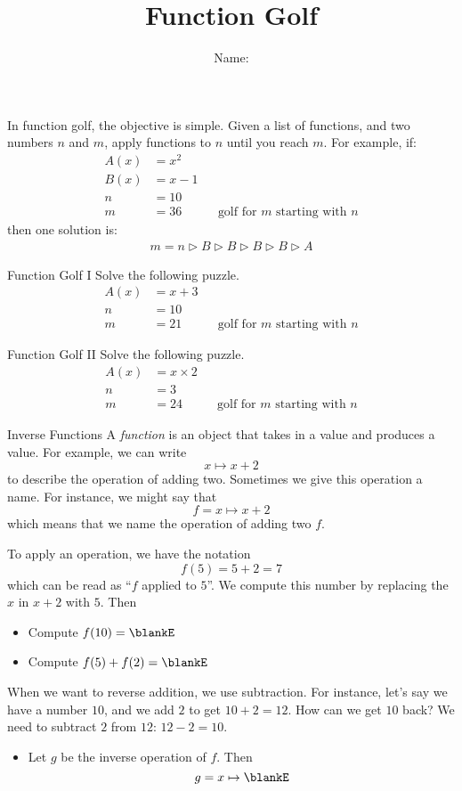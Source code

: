 \documentclass[12pt,letterpaper]{article}
\title{Function Golf}
\author{Name: \underline{\hspace{5cm}}}
\begin{document}
\HomeworkTitle

\thispagestyle{empty}

In function golf, the objective is simple. Given a list of functions, and two
numbers $n$ and $m$, apply functions to $n$ until you reach $m$. For example,
if:
\begin{align*}
 A(x) &= x^2 \\
 B(x) &= x-1 \\
 n &= 10 \\
 m &= 36 && \text{golf for $m$ starting with $n$}
\end{align*}
then one solution is:
\begin{align*}
 m = n \rhd B \rhd B \rhd B \rhd B \rhd A
\end{align*}

\begin{problem}{Function Golf I}
 Solve the following puzzle.
 \begin{align*}
  A(x) &= x + 3 \\
  n &= 10 \\
  m &= 21 && \text{golf for $m$ starting with $n$}
 \end{align*}
\end{problem}

\begin{problem}{Function Golf II}
 Solve the following puzzle.
 \begin{align*}
  A(x) &= x \times 2 \\
  n &= 3 \\
  m &= 24 && \text{golf for $m$ starting with $n$}
 \end{align*}
\end{problem}

\begin{problem}{Inverse Functions}
A \emph{function} is an object that takes in a value and produces a value.
For example, we can write \[
  x \mapsto x + 2
\] to describe the operation of adding two. Sometimes we give this operation
a name. For instance, we might say that \[
  f = x \mapsto x + 2
\] which means that we name the operation of adding two \(f\).

To apply an operation, we have the notation \[
  f(5) = 5 + 2 = 7
\] which can be read as ``\(f\) applied to \(5\)''. We compute this number by
replacing the \(x\) in \(x + 2\) with \(5\). Then

\begin{itemize}
  \item Compute \(f(10) = \blankE\)
  \item Compute \(f(5) + f(2) = \blankE\)
\end{itemize}

When we want to reverse addition, we use subtraction. For instance, let's say
we have a number \(10\), and we add \(2\) to get \(10 + 2 = 12\). How can we
get \(10\) back? We need to subtract \(2\) from \(12\): \(12 - 2 = 10\).

\begin{itemize}
  \item Let \(g\) be the inverse operation of \(f\). Then \[
    g = x \mapsto \blankE
  \]
\end{itemize}
\end{problem}
\end{document}
